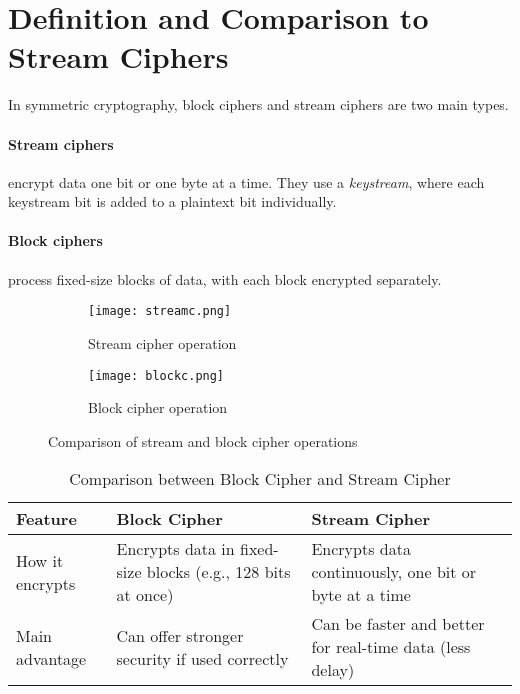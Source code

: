\section{Definition and Comparison to Stream Ciphers}

In symmetric cryptography, block ciphers and stream ciphers are two main types.

\paragraph{Stream ciphers} encrypt data one bit or one byte at a time. 
They use a \textit{keystream}, where each keystream bit is added to a plaintext bit individually.

\paragraph{Block ciphers} process fixed-size blocks of data, with each block encrypted separately.


\begin{figure}[h]
    \centering
    \begin{subfigure}[b]{0.45\textwidth}
        \centering
        \texttt{[image: streamc.png]}
        \caption{Stream cipher operation}
        \label{fig:stream_cipher}
    \end{subfigure}
    \hfill
    \begin{subfigure}[b]{0.45\textwidth}
        \centering
        \texttt{[image: blockc.png]}
        \caption{Block cipher operation}
        \label{fig:block_cipher}
    \end{subfigure}
    \caption{Comparison of stream and block cipher operations}
    \label{fig:cipher_comparison}
\end{figure}



\begin{table}[h]
    \centering
    \begin{tabular}{p{3.5cm} p{5cm} p{5cm}}
    \hline
    \textbf{Feature} & \textbf{Block Cipher} & \textbf{Stream Cipher} \\
    \hline
    How it encrypts & Encrypts data in fixed-size blocks (e.g., 128 bits at once) & Encrypts data continuously, one bit or byte at a time \\
    \hline
    Main advantage & Can offer stronger security if used correctly & Can be faster and better for real-time data (less delay) \\
    \hline
    \end{tabular}
    \caption{Comparison between Block Cipher and Stream Cipher}
    \label{tab:block_stream_comparison}
    \end{table}